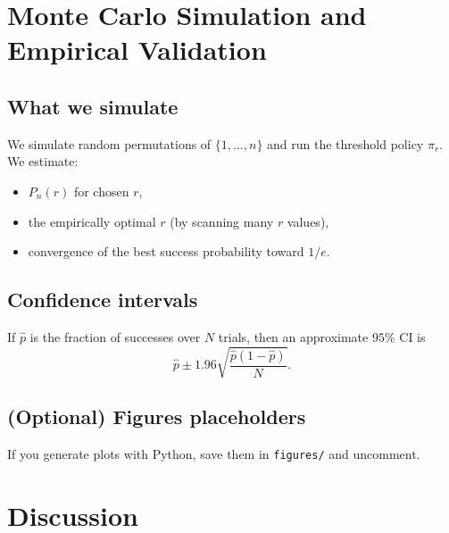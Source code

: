 \documentclass[11pt]{article}
\theoremstyle{plain}
\theoremstyle{definition}
\theoremstyle{remark}
\newcommand{\1}{\mathbf{1}}
\begin{document}
\section{Monte Carlo Simulation and Empirical Validation}
\subsection{What we simulate}
We simulate random permutations of $\{1,\dots,n\}$ and run the threshold policy $\pi_r$.
We estimate:
\begin{itemize}
\item $P_n(r)$ for chosen $r$,
\item the empirically optimal $r$ (by scanning many $r$ values),
\item convergence of the best success probability toward $1/e$.
\end{itemize}

\subsection{Confidence intervals}
If $\hat{p}$ is the fraction of successes over $N$ trials, then an approximate $95\%$ CI is
\[
\hat{p} \pm 1.96\sqrt{\frac{\hat{p}(1-\hat{p})}{N}}.
\]

\subsection{(Optional) Figures placeholders}
If you generate plots with Python, save them in \texttt{figures/} and uncomment.



\section{Discussion}
\end{document}
